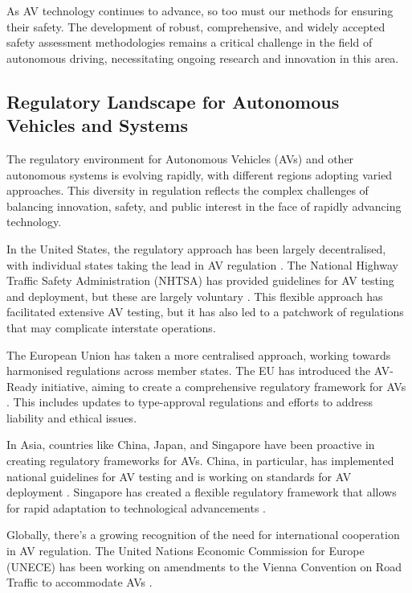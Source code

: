 As AV technology continues to advance, so too must our methods for ensuring their safety. The development of robust, comprehensive, and widely accepted safety assessment methodologies remains a critical challenge in the field of autonomous driving, necessitating ongoing research and innovation in this area.

\subsection{Regulatory Landscape for Autonomous Vehicles and Systems}

The regulatory environment for Autonomous Vehicles (AVs) and other autonomous systems is evolving rapidly, with different regions adopting varied approaches. This diversity in regulation reflects the complex challenges of balancing innovation, safety, and public interest in the face of rapidly advancing technology.

In the United States, the regulatory approach has been largely decentralised, with individual states taking the lead in AV regulation \cite{Claybrook2018}. %
The National Highway Traffic Safety Administration (NHTSA) has provided guidelines for AV testing and deployment, but these are largely voluntary \cite{nhtsa2020}. This flexible approach has facilitated extensive AV testing, but it has also led to a patchwork of regulations that may complicate interstate operations.

The European Union has taken a more centralised approach, working towards harmonised regulations across member states. The EU has introduced the AV-Ready initiative, aiming to create a comprehensive regulatory framework for AVs \cite{EuropeanCommission2020}. This includes updates to type-approval regulations and efforts to address liability and ethical issues.

In Asia, countries like China, Japan, and Singapore have been proactive in creating regulatory frameworks for AVs. China, in particular, has implemented national guidelines for AV testing and is working on standards for AV deployment \cite{Du2020}. Singapore has created a flexible regulatory framework that allows for rapid adaptation to technological advancements \cite{Taeihagh2019}.

Globally, there's a growing recognition of the need for international cooperation in AV regulation. The United Nations Economic Commission for Europe (UNECE) has been working on amendments to the Vienna Convention on Road Traffic to accommodate AVs \cite{UNECE2021}.

